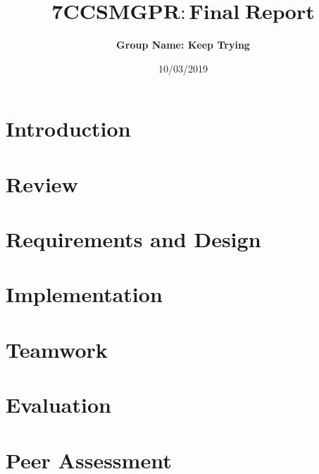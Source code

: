 \documentclass[12pt]{article}
\title{\Huge $\mathbf{7CCSMGPR: 
Final \; Report}$}
\author{\Large \textbf{Group Name: Keep Trying} }
\date{10/03/2019}
\begin{document}
\maketitle

\thispagestyle{empty}

\newpage

\thispagestyle{empty}




\newpage
\setcounter{page}{1}
\vspace{5cm}


\section{Introduction}


\section{Review}
\label{Sec:Sec2}


\section{Requirements and Design}


\section{Implementation}


\section{Teamwork}


\section{Evaluation}


\section{Peer Assessment}




\newpage





\end{document}
